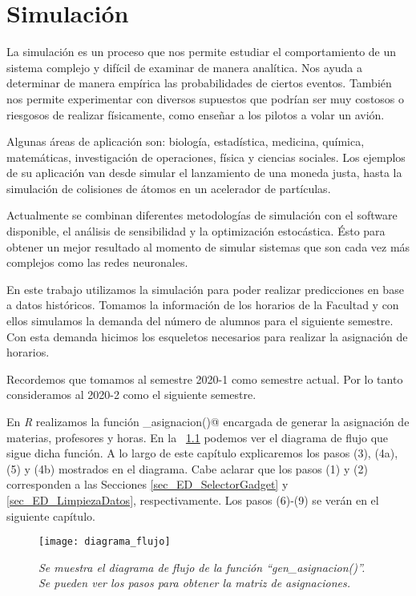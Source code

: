 \chapter{Simulación}

La simulación es un proceso que nos permite estudiar el comportamiento de un sistema complejo y difícil de examinar de manera analítica. Nos ayuda a determinar de manera empírica las probabilidades de ciertos eventos. También nos permite experimentar con diversos supuestos que podrían ser muy costosos o riesgosos de realizar físicamente, como enseñar a los pilotos a volar un avión.

Algunas áreas de aplicación son: biología, estadística, medicina, química, matemáticas, investigación de operaciones, física y ciencias sociales. Los ejemplos de su aplicación van desde simular el lanzamiento de una moneda justa, hasta la simulación de colisiones de átomos en un acelerador de partículas.

Actualmente se combinan diferentes metodologías de simulación con el software disponible, el análisis de sensibilidad y la optimización estocástica. Ésto para obtener un mejor resultado al momento de simular sistemas que son cada vez más complejos como las redes neuronales.

En este trabajo utilizamos la simulación para poder realizar predicciones en base a datos históricos. Tomamos la información de los horarios de la Facultad y con ellos simulamos la demanda del número de alumnos para el siguiente semestre. Con esta demanda hicimos los esqueletos necesarios para realizar la asignación de horarios.

Recordemos que tomamos al semestre 2020-1 como semestre actual. Por lo tanto consideramos al 2020-2 como el siguiente semestre.

En \textit{R} realizamos la función \verb@gen_asignacion()@ encargada de generar la asignación de materias, profesores y horas. En la \figurename{~\ref{DF_genAsig}} podemos ver el diagrama de flujo que sigue dicha función. A lo largo de este capítulo explicaremos los pasos (3), (4a), (5) y (4b) mostrados en el diagrama. Cabe aclarar que los pasos (1) y (2) corresponden a las Secciones \ref{sec_ED_SelectorGadget} y \ref{sec_ED_LimpiezaDatos}, respectivamente. Los pasos (6)-(9) se verán en el siguiente capítulo.

\begin{figure}[H]
\centering
\texttt{[image: diagrama\_flujo]} %
\caption[\textit{Diagrama de flujo de la función ``gen\_asignacion()''}]{\textit{Se muestra el diagrama de flujo de la función ``gen\_asignacion()''. Se pueden ver los pasos para obtener la matriz de asignaciones.}}\label{DF_genAsig}
\end{figure}



